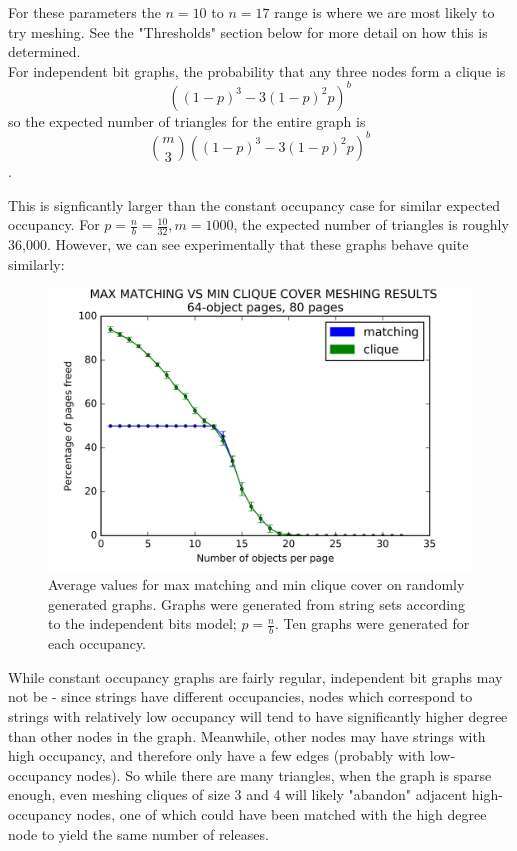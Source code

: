 For these parameters the $n = 10$ to $n = 17$ range is where we are most likely to try meshing.  See the "Thresholds" section below for more detail on how this is determined.\\

For independent bit graphs, the probability that any three nodes form a clique is $$((1-p)^3 - 3(1-p)^2p)^b$$ so the expected number of triangles for the entire graph is $${{m}\choose{3}}((1-p)^3 - 3(1-p)^2p)^b$$.

This is signficantly larger than the constant occupancy case for similar expected occupancy.  For $p = \frac{n}{b} = \frac{10}{32}, m = 1000$, the expected number of triangles is roughly 36,000.  However, we can see experimentally that these graphs behave quite similarly:


\begin{figure}[h]
\includegraphics[scale = .5]{figures/64m80ind.png}
\centering
\caption{Average values for max matching and min clique cover on randomly generated graphs.  Graphs were generated from string sets according to the independent bits model; $p = \frac{n}{b}$.  Ten graphs were generated for each occupancy.}
\end{figure}

While constant occupancy graphs are fairly regular, independent bit graphs may not be - since strings have different occupancies, nodes which correspond to strings with relatively low occupancy will tend to have significantly higher degree than other nodes in the graph.  Meanwhile, other nodes may have strings with high occupancy, and therefore only have a few edges (probably with low-occupancy nodes).  So while there are many triangles, when the graph is sparse enough, even meshing cliques of size 3 and 4 will likely "abandon" adjacent high-occupancy nodes, one of which could have been matched with the high degree node to yield the same number of releases.\\

